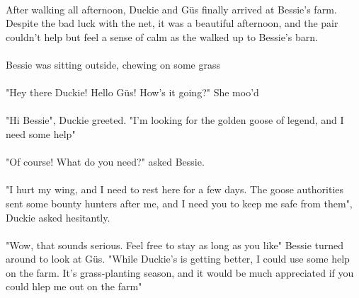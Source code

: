 \documentclass[a4paper,11pt ]{book}
\begin{document}
 \paragraph{} After walking all afternoon, Duckie and Güs finally arrived at Bessie's farm. Despite the bad luck with the net, it was a beautiful afternoon, and the pair couldn't help but feel a sense of calm as the walked up to Bessie's barn.
 \paragraph{} Bessie was sitting outside, chewing on some grass 
 \paragraph{} "Hey there Duckie! Hello Güs! How's it going?" She moo'd
 \paragraph{} "Hi Bessie", Duckie greeted. "I'm looking for the golden goose of legend, and I need some help"
 \paragraph{} "Of course! What do you need?" asked Bessie.
 \paragraph{} "I hurt my wing, and I need to rest here for a few days. The goose authorities sent some bounty hunters after me, and I need you to keep me safe from them", Duckie asked hesitantly.
 \paragraph{} "Wow, that sounds serious. Feel free to stay as long as you like" Bessie turned around to look at Güs. "While Duckie's is getting better, I could use some help on the farm. It's grass-planting season, and it would be much appreciated if you could hlep me out on the farm"
\end{document}

